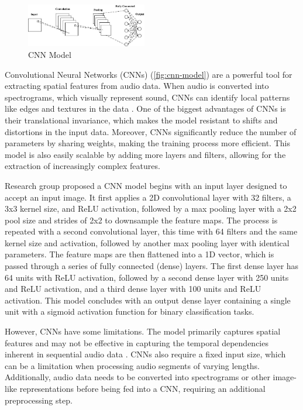 \documentclass[twocolumn]{article}
\begin{document}
\vspace{1em}
\begin{figure}[H]
  \centering
  \includegraphics[width=0.47\textwidth]{CNN-model.jpg}
  \caption{CNN Model}
  \label{fig:cnn-model}
\end{figure}
\vspace{1em}

Convolutional Neural Networks (CNNs) (\autoref{fig:cnn-model}) are a powerful tool for extracting spatial
features from audio data. When audio is converted into spectrograms, which visually
represent sound, CNNs can identify local patterns like edges and textures in the data \cite{oshea2015introduction}.
One of the biggest advantages of CNNs is their translational invariance, which makes the
model resistant to shifts and distortions in the input data. Moreover, CNNs significantly
reduce the number of parameters by sharing weights, making the training process more
efficient. This model is also easily scalable by adding more layers and filters, allowing
for the extraction of increasingly complex features.

Research group proposed a CNN model begins with an input layer
designed to accept an input image. It first applies a 2D
convolutional layer with 32 filters, a 3x3 kernel size, and ReLU
activation, followed by a max pooling layer with a 2x2 pool size and
strides of 2x2 to downsample the feature maps. The process is repeated
with a second convolutional layer, this time with 64 filters and the
same kernel size and activation, followed by another max pooling layer
with identical parameters. The feature maps are then flattened into a
1D vector, which is passed through a series of fully connected (dense)
layers. The first dense layer has 64 units with ReLU activation,
followed by a second dense layer with 250 units and ReLU activation,
and a third dense layer with 100 units and ReLU activation. This model
concludes with an output dense layer containing a single unit with a
sigmoid activation function for binary classification tasks.

However, CNNs have some limitations. The model primarily captures spatial features and may
not be effective in capturing the temporal dependencies inherent in sequential
audio data \cite{lim2020time}. CNNs also require a fixed input size, which can be a limitation when
processing audio segments of varying lengths. Additionally, audio data needs to be
converted into spectrograms or other image-like representations before being fed into a CNN,
requiring an additional preprocessing step.
\end{document}

